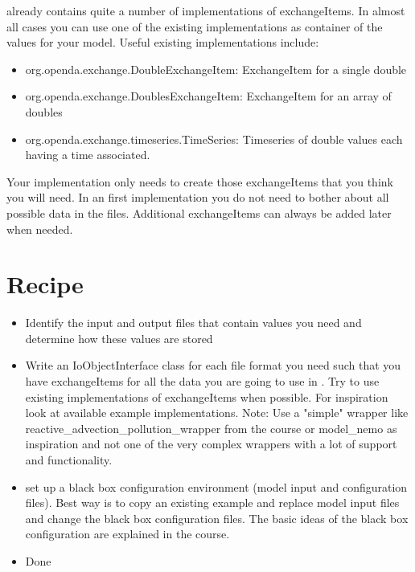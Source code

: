 \oda already contains quite a number of implementations of exchangeItems. In
almost all cases you can use one of the existing implementations as container
of the values for your model. Useful existing implementations include:
\begin{itemize}
\item org.openda.exchange.DoubleExchangeItem: ExchangeItem for a single double
\item org.openda.exchange.DoublesExchangeItem: ExchangeItem for an array of
  doubles
\item org.openda.exchange.timeseries.TimeSeries: Timeseries of double values
  each having a time associated.
\end{itemize}

Your implementation only needs to create those exchangeItems that you think you
will need. In an first implementation you do not need to bother about all
possible data in the files. Additional exchangeItems can always be added later
when needed.

\section{Recipe}
\begin{itemize}
\item Identify the input and output files that contain values you need and
  determine how these values are stored
\item Write an IoObjectInterface class for each file format you need such that
  you have exchangeItems for all the data you are going to use in \oda. Try to
  use existing implementations of exchangeItems when possible. For inspiration
  look at available example implementations. Note: Use a "simple" wrapper like
  reactive\_advection\_pollution\_wrapper from the \oda course or model\_nemo
  as inspiration and not one of the very complex wrappers with a lot of support
  and functionality.
\item set up a black box configuration environment (model input and
  configuration files). Best way is to copy an existing example and replace
  model input files and change the black box configuration files. The basic
  ideas of the black box configuration are explained in the \oda course.
\item Done
\end{itemize}






